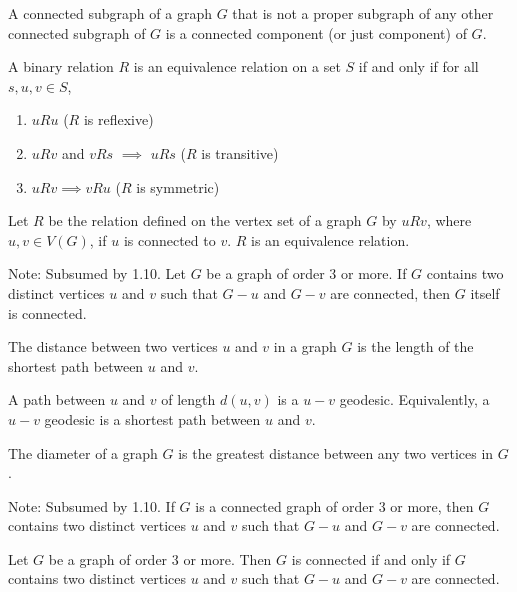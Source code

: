 \documentclass{article}
\begin{document}
\medskip
{}

    A connected subgraph of a graph $G$ that is not a proper subgraph of any other connected subgraph of $G$ is a connected component (or just component) of $G$.

\medskip
{}

    A binary relation $R$ is an equivalence relation on a set $S$ if and only if for all $s,u,v \in S$,
    \begin{enumerate}
        \item $u R u$ ($R$ is reflexive)
        \item $u R v$ and $v R s$ $\implies$ $u R s$ ($R$ is transitive)
        \item $u R v \implies v R u$ ($R$ is symmetric)
    \end{enumerate}

\medskip
{}

    Let $R$ be the relation defined on the vertex set of a graph $G$ by $u R v$, where $u,v \in V(G)$, if $u$ is connected to $v$. $R$ is an equivalence relation.

\medskip
{}

    Note: Subsumed by 1.10.
    Let $G$ be a graph of order 3 or more. If $G$ contains two distinct vertices $u$ and $v$ such that $G - u$ and $G - v$ are connected, then $G$ itself is connected.

\medskip
{}

    The distance between two vertices $u$ and $v$ in a graph $G$ is the length of the shortest path between $u$ and $v$.

\medskip
{}

    A path between $u$ and $v$ of length $d(u,v)$ is a $u-v$ geodesic. Equivalently, a $u-v$ geodesic is a shortest path between $u$ and $v$.

\medskip
{}

    The diameter of a graph $G$ is the greatest distance between any two vertices in $G$.

\medskip
{}

    Note: Subsumed by 1.10.
    If $G$ is a connected graph of order 3 or more, then $G$ contains two distinct vertices $u$ and $v$ such that $G - u$ and $G - v$ are connected.

\medskip
{}

    Let $G$ be a graph of order 3 or more. Then $G$ is connected if and only if $G$ contains two distinct vertices $u$ and $v$ such that $G - u$ and $G - v$ are connected.
\end{document}
